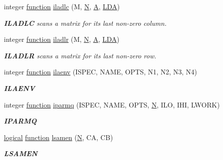\begin{DoxyCompactItemize}
integer \hyperlink{afunc_8m_a7b5e596df91eadea6c537c0825e894a7}{function} \hyperlink{group__auxOTHERauxiliary_gab8b3783390380038c9d26de61d7aefb4}{iladlc} (M, \hyperlink{polmisc_8c_a0240ac851181b84ac374872dc5434ee4}{N}, \hyperlink{classA}{A}, \hyperlink{example__user_8c_ae946da542ce0db94dced19b2ecefd1aa}{L\+D\+A})
\begin{DoxyCompactList}\small\item\em {\bfseries I\+L\+A\+D\+L\+C} scans a matrix for its last non-\/zero column. \end{DoxyCompactList}\item 
integer \hyperlink{afunc_8m_a7b5e596df91eadea6c537c0825e894a7}{function} \hyperlink{group__auxOTHERauxiliary_gac0eeaff271e43cd10d066ef1cceb5f3b}{iladlr} (M, \hyperlink{polmisc_8c_a0240ac851181b84ac374872dc5434ee4}{N}, \hyperlink{classA}{A}, \hyperlink{example__user_8c_ae946da542ce0db94dced19b2ecefd1aa}{L\+D\+A})
\begin{DoxyCompactList}\small\item\em {\bfseries I\+L\+A\+D\+L\+R} scans a matrix for its last non-\/zero row. \end{DoxyCompactList}\item 
integer \hyperlink{afunc_8m_a7b5e596df91eadea6c537c0825e894a7}{function} \hyperlink{group__auxOTHERauxiliary_gab1f37bde76d31aee91a09bb2f8e87ce6}{ilaenv} (I\+S\+P\+E\+C, N\+A\+M\+E, O\+P\+T\+S, N1, N2, N3, N4)
\begin{DoxyCompactList}\small\item\em {\bfseries I\+L\+A\+E\+N\+V} \end{DoxyCompactList}\item 
integer \hyperlink{afunc_8m_a7b5e596df91eadea6c537c0825e894a7}{function} \hyperlink{group__auxOTHERauxiliary_ga6e703cb600283f4bcb1b340cfd8ad3d9}{iparmq} (I\+S\+P\+E\+C, N\+A\+M\+E, O\+P\+T\+S, \hyperlink{polmisc_8c_a0240ac851181b84ac374872dc5434ee4}{N}, I\+L\+O, I\+H\+I, L\+W\+O\+R\+K)
\begin{DoxyCompactList}\small\item\em {\bfseries I\+P\+A\+R\+M\+Q} \end{DoxyCompactList}\item 
\hyperlink{tnc_8c_aa7b64cdf39500931f7b333343791a104}{logical} \hyperlink{afunc_8m_a7b5e596df91eadea6c537c0825e894a7}{function} \hyperlink{group__auxOTHERauxiliary_ga0b496168bf04278e5e57050403c150aa}{lsamen} (\hyperlink{polmisc_8c_a0240ac851181b84ac374872dc5434ee4}{N}, C\+A, C\+B)
\begin{DoxyCompactList}\small\item\em {\bfseries L\+S\+A\+M\+E\+N} \end{DoxyCompactList}\item 

\end{DoxyCompactItemize}
